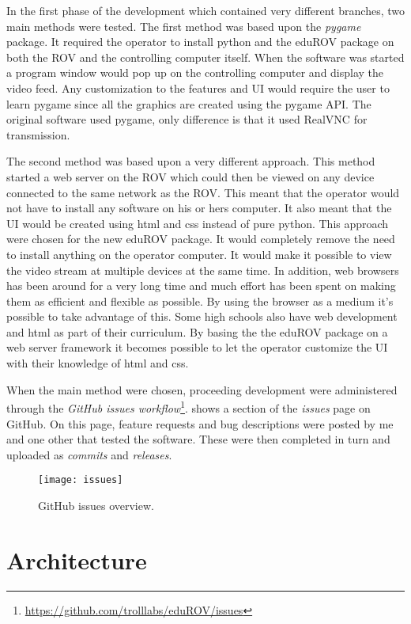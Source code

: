 In the first phase of the development which contained very different branches, two main methods were tested. The first method was based upon the \emph{pygame} package. It required the operator to install python and the eduROV package on both the ROV and the controlling computer itself. When the software was started a program window would pop up on the controlling computer and display the video feed. Any customization to the features and UI would require the user to learn pygame since all the graphics are created using the pygame API. The original software used pygame, only difference is that it used RealVNC for transmission.

The second method was based upon a very different approach. This method started a web server on the ROV which could then be viewed on any device connected to the same network as the ROV. This meant that the operator would not have to install any software on his or hers computer. It also meant that the UI would be created using html and css instead of pure python. This approach were chosen for the new eduROV package. It would completely remove the need to install anything on the operator computer. It would make it possible to view the video stream at multiple devices at the same time. In addition, web browsers has been around for a very long time and much effort has been spent on making them as efficient and flexible as possible. By using the browser as a medium it's possible to take advantage of this. Some high schools also have web development and html as part of their curriculum. By basing the the eduROV package on a web server framework it becomes possible to let the operator customize the UI with their knowledge of html and css.

When the main method were chosen, proceeding development were administered through the \emph{GitHub issues workflow}\footnote{\url{https://github.com/trolllabs/eduROV/issues}}.  shows a section of the \emph{issues} page on GitHub. On this page, feature requests and bug descriptions were posted by me and one other that tested the software. These were then completed in turn and uploaded as \textit{commits} and \textit{releases}.

\begin{figure}[h!]
    \centering
    \texttt{[image: issues]}
    \caption{GitHub issues overview.}
    \label{issues}
\end{figure}

\section{Architecture}

